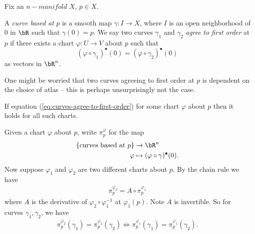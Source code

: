 Fix an $n-manifold$ $X$, $p \in X$.
\begin{defn}\label{defn:curve-based-at-p}
	A \emph{curve based at $p$} is a smooth map $\gamma:I \to X$, where $I$ is an open neighborhood of $0$ in $\bR$ such that $\gamma(0) = p$. We say two curves $\gamma_1$ and $\gamma_2$ \emph{agree to first order} at $p$ if there exists a chart $\varphi:U \to V$ about $p$ such that
	\begin{equation}\label{eq:curves-agree-to-first-order}
		\left(\varphi \circ \gamma_1\right)^\bullet(0) = \left(\varphi\circ \gamma_2\right)^\bullet(0)
	\end{equation}
	as vectors in $\bR^n$.
\end{defn}
One might be worried that two curves agreeing to first order at $p$ is dependent on the choice of atlas -- this is perhaps unsurprisingly not the case.
\begin{lem}\label{lem:first-order-agreement-independent-of-chart}
	If equation (\ref{eq:curves-agree-to-first-order}) for some chart $\varphi$ about $p$ then it holds for all such charts.
\end{lem}
\begin{prf}
	Given a chart $\varphi$ about $p$, write $\pi_p^\varphi$ for the map
	\begin{align*}
		\{\text{curves based at $p$}\} &\to \bR^n \\
		\varphi &\mapsto (\varphi\circ \gamma)^\bullet(0).
	\end{align*}
	Now suppose $\varphi_1$ and $\varphi_2$ are two different charts about $p$. By the chain rule we have 
	\begin{align*}	
	    \pi_p^{\varphi_2} = A \circ \pi_p^{\varphi_1}
	\end{align*}
	where $A$ is the derivative of $\varphi_2\circ \varphi_1^{-1}$ at $\varphi_1(p)$. Note $A$ is invertible. So for curves $\gamma_1, \gamma_2$, we have
	\begin{align*}
		\pi_p^{\varphi_2}(\gamma_1) = \pi_p^{\varphi_2}(\gamma_2) \iff \pi_p^{\varphi_1}(\gamma_1) = \pi_p^{\varphi_1}(\gamma_2).
	\end{align*}
\end{prf}

